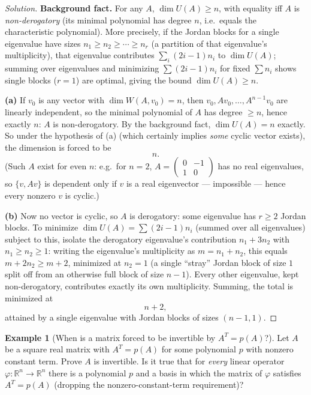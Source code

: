 \documentclass[11pt]{article}
\theoremstyle{definition}
\newtheorem{example}{Example}[section]
\newcommand{\R}{\mathbb{R}}
\begin{document}
\begin{proof}[Solution]
\textbf{Background fact.} For any $A$, $\dim U(A)\ge n$, with equality iff $A$ is \emph{non-derogatory} (its minimal polynomial has degree $n$, i.e.\ equals the characteristic polynomial). More precisely, if the Jordan blocks for a single eigenvalue have sizes $n_1\ge n_2\ge\cdots\ge n_r$ (a partition of that eigenvalue's multiplicity), that eigenvalue contributes $\sum_i (2i-1)n_i$ to $\dim U(A)$; summing over eigenvalues and minimizing $\sum(2i-1)n_i$ for fixed $\sum n_i$ shows single blocks ($r=1$) are optimal, giving the bound $\dim U(A)\ge n$.

\textbf{(a)} If $v_0$ is any vector with $\dim W(A,v_0)=n$, then $v_0,Av_0,\dots,A^{n-1}v_0$ are linearly independent, so the minimal polynomial of $A$ has degree $\ge n$, hence exactly $n$: $A$ is non-derogatory. By the background fact, $\dim U(A)=n$ exactly. So under the hypothesis of (a) (which certainly implies \emph{some} cyclic vector exists), the dimension is forced to be
\[
\boxed{n}.
\]
(Such $A$ exist for even $n$: e.g.\ for $n=2$, $A=\begin{pmatrix}0&-1\\1&0\end{pmatrix}$ has no real eigenvalues, so $\{v,Av\}$ is dependent only if $v$ is a real eigenvector — impossible — hence every nonzero $v$ is cyclic.)

\textbf{(b)} Now no vector is cyclic, so $A$ is derogatory: some eigenvalue has $r\ge2$ Jordan blocks. To minimize $\dim U(A)=\sum(2i-1)n_i$ (summed over all eigenvalues) subject to this, isolate the derogatory eigenvalue's contribution $n_1+3n_2$ with $n_1\ge n_2\ge1$: writing the eigenvalue's multiplicity as $m=n_1+n_2$, this equals $m+2n_2\ge m+2$, minimized at $n_2=1$ (a single ``stray'' Jordan block of size $1$ split off from an otherwise full block of size $n-1$). Every other eigenvalue, kept non-derogatory, contributes exactly its own multiplicity. Summing, the total is minimized at
\[
\boxed{n+2},
\]
attained by a single eigenvalue with Jordan blocks of sizes $(n-1,1)$.
\end{proof}

\begin{example}[When is a matrix forced to be invertible by $A^T=p(A)$?]
Let $A$ be a square real matrix with $A^T=p(A)$ for some polynomial $p$ with nonzero constant term. Prove $A$ is invertible. Is it true that for \emph{every} linear operator $\varphi:\R^n\to\R^n$ there is a polynomial $p$ and a basis in which the matrix of $\varphi$ satisfies $A^T=p(A)$ (dropping the nonzero-constant-term requirement)?
\end{example}
\end{document}
